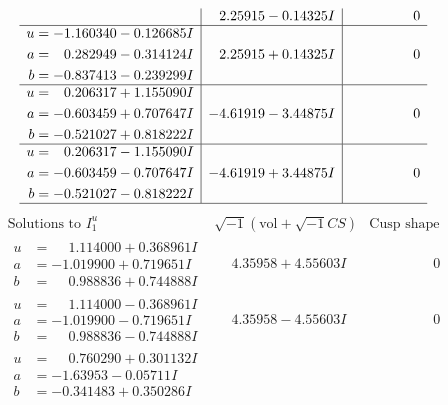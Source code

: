 \documentclass[1p]{elsarticle_modified}
\theoremstyle{definition}
\newcommand{\I}{\sqrt{-1}}
\begin{document}
$$\begin{array}{c|c|c}
 & \phantom{-}2.25915 - 0.14325 I & \phantom{-0.000000 } 0 \\ \hline\begin{aligned}
u &= -1.160340 - 0.126685 I \\
a &= \phantom{-}0.282949 - 0.314124 I \\
b &= -0.837413 - 0.239299 I\end{aligned}
 & \phantom{-}2.25915 + 0.14325 I & \phantom{-0.000000 } 0 \\ \hline\begin{aligned}
u &= \phantom{-}0.206317 + 1.155090 I \\
a &= -0.603459 + 0.707647 I \\
b &= -0.521027 + 0.818222 I\end{aligned}
 & -4.61919 - 3.44875 I & \phantom{-0.000000 } 0 \\ \hline\begin{aligned}
u &= \phantom{-}0.206317 - 1.155090 I \\
a &= -0.603459 - 0.707647 I \\
b &= -0.521027 - 0.818222 I\end{aligned}
 & -4.61919 + 3.44875 I & \phantom{-0.000000 } 0\\
 \hline 
 \end{array}$$\newpage$$\begin{array}{c|c|c}  
\text{Solutions to }I^u_{1}& \I (\text{vol} + \sqrt{-1}CS) & \text{Cusp shape}\\
 \hline 
\begin{aligned}
u &= \phantom{-}1.114000 + 0.368961 I \\
a &= -1.019900 + 0.719651 I \\
b &= \phantom{-}0.988836 + 0.744888 I\end{aligned}
 & \phantom{-}4.35958 + 4.55603 I & \phantom{-0.000000 } 0 \\ \hline\begin{aligned}
u &= \phantom{-}1.114000 - 0.368961 I \\
a &= -1.019900 - 0.719651 I \\
b &= \phantom{-}0.988836 - 0.744888 I\end{aligned}
 & \phantom{-}4.35958 - 4.55603 I & \phantom{-0.000000 } 0 \\ \hline\begin{aligned}
u &= \phantom{-}0.760290 + 0.301132 I \\
a &= -1.63953 - 0.05711 I \\
b &= -0.341483 + 0.350286 I\end{aligned}

\end{array}$$
\end{document}
